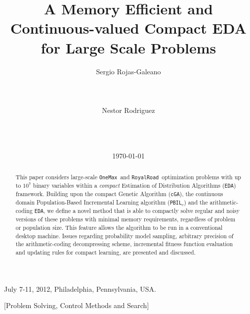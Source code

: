 \documentclass{sig-alternate}
\newcommand{\PBILc}{\texttt{PBIL$_c$}}
\newcommand{\cGA}{\texttt{cGA}}
\newcommand{\EDA}{\texttt{EDA}}
\newcommand{\onemax}{\texttt{OneMax}}
\newcommand{\rroad}{\texttt{RoyalRoad}}
\begin{document}
  {July 7-11, 2012, Philadelphia, Pennsylvania, USA.}

\title{A Memory Efficient and Continuous-valued Compact EDA for Large Scale Problems}
%

\author{
\alignauthor
Sergio Rojas-Galeano\\
       \\
       \\
       \\
\alignauthor
Nestor Rodriguez\\
       \\
       \\
       \\
}
\date{\today}
\maketitle

\begin{abstract}
This paper considers large-scale \onemax~and \rroad~optimization problems with up to $10^7$ binary variables within a \emph{compact} Estimation of Distribution Algorithms (\EDA) framework. Building upon the compact Genetic Algorithm (\cGA), the continuous domain Population-Based Incremental Learning algorithm (\PBILc) and the arithmetic-coding \EDA, we define a novel method that is able to compactly solve regular and noisy versions of these problems with minimal memory requirements, regardless of problem or population size. This feature allows the algorithm to be run in a conventional desktop machine. Issues regarding probability model sampling, arbitrary precision of the arithmetic-coding decompressing scheme, incremental fitness function evaluation and updating rules for compact learning, are presented and discussed.
\end{abstract}

[Problem Solving, Control Methods and Search]


\end{document}
